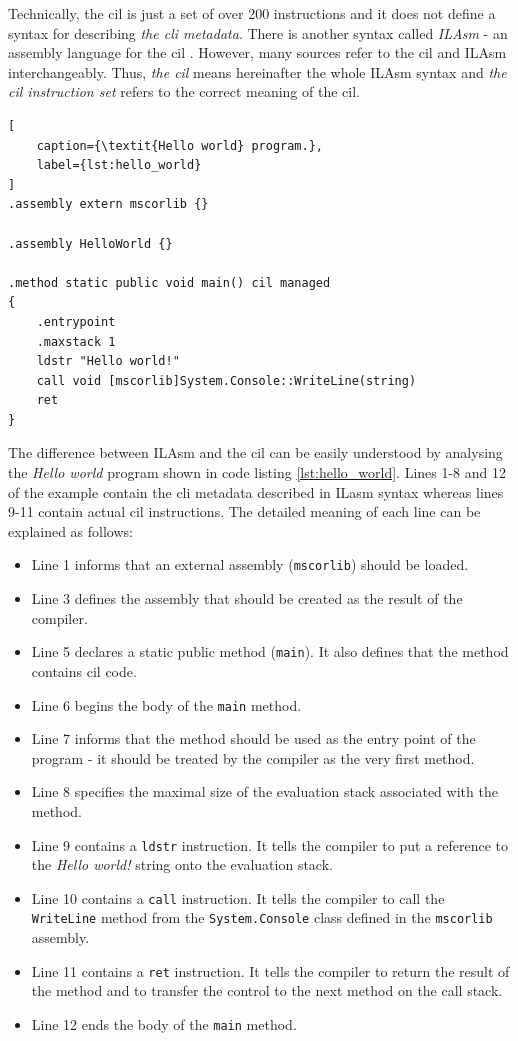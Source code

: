 \documentclass[declaration,shortabstract,english,mgr]{iithesis}
\begin{document}
Technically, the \acrshort{cil} is just a set of over 200 instructions and it does not define a syntax for describing \textit{the \acrshort{cli} metadata}. There is another syntax called \textit{ILAsm} - an assembly language for the \acrshort{cil} \cite{ecmaStandard}. However, many sources refer to the \acrshort{cil} and ILAsm interchangeably. Thus, \textit{the \acrshort{cil}} means hereinafter the whole ILAsm syntax and \textit{the \acrshort{cil} instruction set} refers to the correct meaning of the \acrlong{cil}.

\begin{lstlisting}[
	caption={\textit{Hello world} program.},
	label={lst:hello_world}
]
.assembly extern mscorlib {}

.assembly HelloWorld {}

.method static public void main() cil managed
{
	.entrypoint
	.maxstack 1
	ldstr "Hello world!"
	call void [mscorlib]System.Console::WriteLine(string)
	ret
}
\end{lstlisting}

The difference between ILAsm and the \acrshort{cil} can be easily understood by analysing the \textit{Hello world} program shown in code listing \ref{lst:hello_world}. Lines 1-8 and 12 of the example contain the \acrshort{cli} metadata described in ILasm syntax whereas lines 9-11 contain actual \acrshort{cil} instructions. The detailed meaning of each line can be explained as follows:
\begin{itemize}
	\item{Line 1 informs that an external assembly (\texttt{mscorlib}) should be loaded.}
	\item{Line 3 defines the assembly that should be created as the result of the compiler.}
	\item{Line 5 declares a static public method (\texttt{main}). It also defines that the method contains \acrshort{cil} code.}
	\item{Line 6 begins the body of the \texttt{main} method.}
	\item{Line 7 informs that the method should be used as the entry point of the program - it should be treated by the compiler as the very first method.}
	\item{Line 8 specifies the maximal size of the evaluation stack associated with the method.}
	\item{Line 9 contains a \texttt{ldstr} instruction. It tells the compiler to put a reference to the \textit{Hello world!} string onto the evaluation stack.}
	\item{Line 10 contains a \texttt{call} instruction. It tells the compiler to call the \texttt{WriteLine} method from the \texttt{System.Console} class defined in the \texttt{mscorlib} assembly.}
	\item{Line 11 contains a \texttt{ret} instruction. It tells the compiler to return the result of the method and to transfer the control to the next method on the call stack.}
	\item{Line 12 ends the body of the \texttt{main} method.}
\end{itemize}
\end{document}
